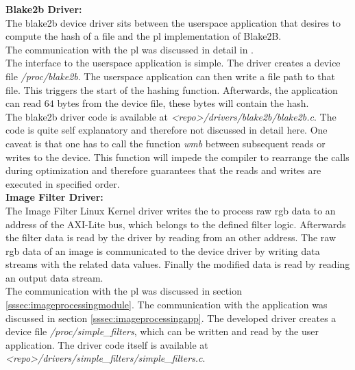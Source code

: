 
\textbf{Blake2b Driver:}\\
The blake2b device driver sits between the userspace application that desires to
compute the hash of a file and the \gls{pl} implementation of Blake2B.\\
The communication with the \gls{pl} was discussed in detail in
.\\
The interface to the userspace application is simple.
The driver creates a device file \emph{/proc/blake2b}.
The userspace application can then write a file path to that file.
This triggers the start of the hashing function.
Afterwards, the application can read $64$ bytes from the device file, these
bytes will contain the hash.\\
The blake2b driver code is available at \emph{<repo>/drivers/blake2b/blake2b.c}.
The code is quite self explanatory and therefore not discussed in detail here.
One caveat is that one has to call the function \emph{wmb} between subsequent
reads or writes to the device.
This function will impede the compiler to rearrange the calls during
optimization and therefore guarantees that the reads and writes are executed in
specified order.
\\
\textbf{Image Filter Driver:}\\
The Image Filter Linux Kernel driver writes the to process raw \gls{rgb} data to an address of the AXI-Lite bus, which belongs to the defined filter logic. Afterwards the filter data is read by the driver by reading from an other address. The raw \gls{rgb} data of an image is communicated to the device driver by writing data streams with the related data values. Finally the modified data is read by reading an output data stream.\\
The communication with the \gls{pl} was discussed in section \ref{sssec:imageprocessingmodule}. The communication with the application was discussed in section \ref{sssec:imageprocessingapp}. The developed driver creates a device file \emph{/proc/simple_filters}, which can be written and read by the user application. The driver code itself is available at \emph{<repo>/drivers/simple_filters/simple_filters.c}.
